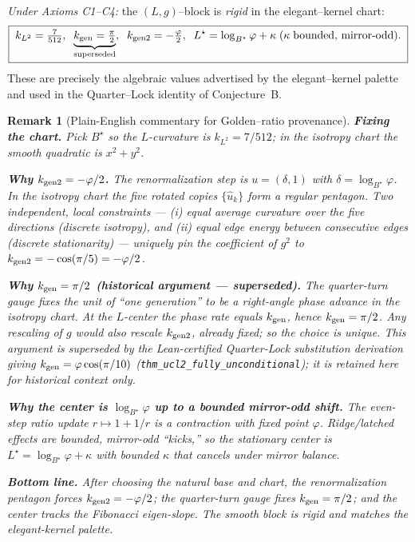 \documentclass[12pt]{article}
\newtheorem*{remark*}{Remark}
\numberwithin{equation}{section}
\begin{document}
\noindent\textit{Under Axioms C1--C4:} the $(L,g)$–block is \emph{rigid} in the elegant–kernel chart:
\[
\boxed{\; k_{L^2}=\tfrac{7}{512},\;\;
\underbrace{k_{\rm gen}=\tfrac{\pi}{2}}_{\text{superseded}},\;\;
k_{\rm gen2}=-\tfrac{\varphi}{2},\;\;
L^\star=\log_{B^\star}\varphi+\kappa\;(\kappa\;\text{bounded, mirror-odd}).\;}
\]
These are precisely the algebraic values advertised by the elegant–kernel palette and used in the Quarter–Lock identity of Conjecture~B.

\begin{remark*}[Plain-English commentary for Golden–ratio provenance]
\textbf{Fixing the chart.}
Pick $B^\star$ so the $L$-curvature is $k_{L^2}=7/512$; in the isotropy chart the smooth quadratic is $x^2+y^2$.

\textbf{Why $k_{\rm gen2}=-\varphi/2$.}
The renormalization step is $u=(\delta,1)$ with $\delta=\log_{B^\star}\varphi$. In the isotropy chart the five rotated copies $\{\hat u_k\}$ form a regular pentagon. Two independent, local constraints — (i) equal average curvature over the five directions (discrete isotropy), and (ii) equal edge energy between consecutive edges (discrete stationarity) — uniquely pin the coefficient of $g^2$ to $k_{\rm gen2}=-\cos(\pi/5)=-\varphi/2$.

\textbf{Why $k_{\rm gen}=\pi/2$ (historical argument — superseded).}
The quarter-turn gauge fixes the unit of ``one generation'' to be a right-angle phase advance in the isotropy chart. At the $L$-center the phase rate equals $k_{\rm gen}$, hence $k_{\rm gen}=\pi/2$. Any rescaling of $g$ would also rescale $k_{\rm gen2}$, already fixed; so the choice is unique. \textit{This argument is superseded by the Lean-certified Quarter-Lock substitution derivation giving $k_{\rm gen}=\varphi\cos(\pi/10)$ (\texttt{thm\_ucl2\_fully\_unconditional}); it is retained here for historical context only.}

\textbf{Why the center is $\log_{B^\star}\varphi$ up to a bounded mirror-odd shift.}
The even-step ratio update $r\mapsto 1+1/r$ is a contraction with fixed point $\varphi$. Ridge/latched effects are bounded, mirror-odd ``kicks,'' so the stationary center is $L^\star=\log_{B^\star}\varphi+\kappa$ with bounded $\kappa$ that cancels under mirror balance.

\textbf{Bottom line.}
After choosing the natural base and chart, the renormalization pentagon forces $k_{\rm gen2}=-\varphi/2$; the quarter-turn gauge fixes $k_{\rm gen}=\pi/2$; and the center tracks the Fibonacci eigen-slope. The smooth block is rigid and matches the elegant-kernel palette.
\end{remark*}
\end{document}
